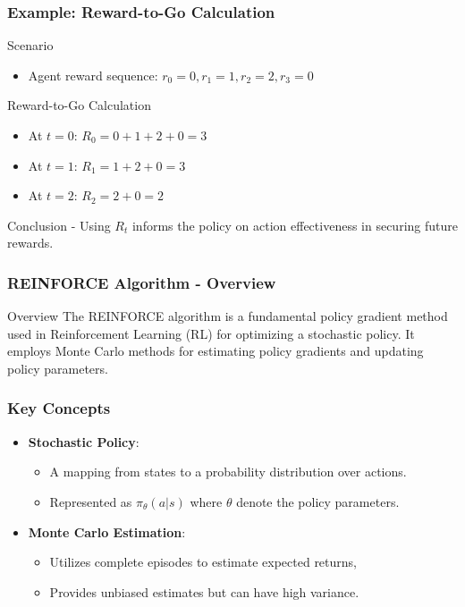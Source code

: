 \documentclass[aspectratio=169]{beamer}
\begin{document}
\begin{frame}[fragile]
    \frametitle{Example: Reward-to-Go Calculation}
    \begin{block}{Scenario}
        \begin{itemize}
            \item Agent reward sequence: \(r_0 = 0, r_1 = 1, r_2 = 2, r_3 = 0\)
        \end{itemize}
    \end{block}
    
    \begin{block}{Reward-to-Go Calculation}
        \begin{itemize}
            \item At \(t = 0\): \(R_0 = 0 + 1 + 2 + 0 = 3\)
            \item At \(t = 1\): \(R_1 = 1 + 2 + 0 = 3\)
            \item At \(t = 2\): \(R_2 = 2 + 0 = 2\)
        \end{itemize}
        
        \begin{block}{Conclusion}
            - Using \(R_t\) informs the policy on action effectiveness in securing future rewards.
        \end{block}
    \end{block}
\end{frame}

\begin{frame}[fragile]
    \frametitle{REINFORCE Algorithm - Overview}
    \begin{block}{Overview}
        The REINFORCE algorithm is a fundamental policy gradient method 
        used in Reinforcement Learning (RL) for optimizing a stochastic policy. 
        It employs Monte Carlo methods for estimating policy gradients and 
        updating policy parameters.
    \end{block}
\end{frame}

\begin{frame}[fragile]
    \frametitle{Key Concepts}
    \begin{itemize}
        \item \textbf{Stochastic Policy}:
        \begin{itemize}
            \item A mapping from states to a probability distribution over actions.
            \item Represented as \( \pi_\theta(a|s) \) where \( \theta \) denote the policy parameters.
        \end{itemize}
        
        \item \textbf{Monte Carlo Estimation}:
        \begin{itemize}
            \item Utilizes complete episodes to estimate expected returns,
            \item Provides unbiased estimates but can have high variance.
        \end{itemize}
    \end{itemize}
\end{frame}
\end{document}
